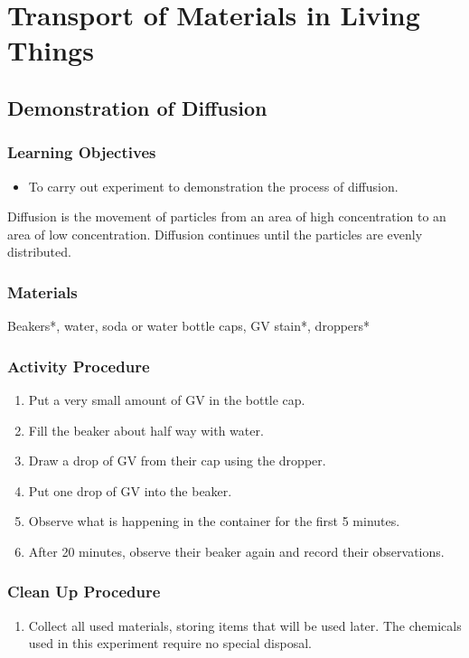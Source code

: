 \section{Transport of Materials in Living Things}

\subsection{Demonstration of Diffusion}

\subsubsection*{Learning Objectives}
\begin{itemize}
\item{To carry out experiment to demonstration the process of diffusion.}
\end{itemize}


Diffusion is the movement of particles from an area of high concentration to an area of low concentration. Diffusion continues until the particles are evenly distributed.

\subsubsection*{Materials}
Beakers*, water, soda or water bottle caps, GV stain*, droppers*

\subsubsection*{Activity Procedure}
\begin{enumerate}
\item{Put a very small amount of GV in the bottle cap.}
\item{Fill the beaker about half way with water.}
\item{Draw a drop of GV from their cap using the dropper.}
\item{Put one drop of GV into the beaker.}
\item{Observe what is happening in the container for the first 5 minutes.}
\item{After 20 minutes, observe their beaker again and record their observations.}
\end{enumerate}

\subsubsection*{Clean Up Procedure}
\begin{enumerate}
\item{Collect all used materials, storing items that will be used later. The chemicals used in this experiment require no special disposal.}
\end{enumerate}

